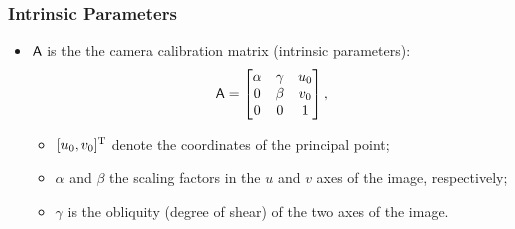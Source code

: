\documentclass{beamer}
\begin{document}


		\begin{frame}\frametitle{Intrinsic Parameters}
			\begin{itemize}
			 \item $\mathsf{A}$ is the the camera calibration matrix (intrinsic parameters):
			 \begin{equation*}
			\mathsf{A} =
			\begin{bmatrix}
			\alpha & \gamma & u_0\\
			0 & \beta  & v_0\\
			0 &     0  & 1\\
			\end{bmatrix},
			\end{equation*}
			\begin{itemize}
			 \item $[u_0,v_0]^{\mathrm{T}}$ denote the coordinates of the principal point;
			 \item $\alpha$ and $\beta$ the scaling factors in the $ u $ and $ v $ axes of the image, respectively;
			 \item $\gamma$ is the obliquity (degree of shear) of the two axes of the image.
			\end{itemize}
			\end{itemize}
		\end{frame}
\end{document}
